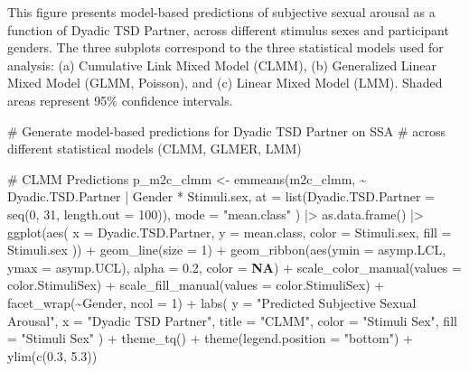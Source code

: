 \documentclass[
  bookmarksnumbered]{article}
\newenvironment{Shaded}{\begin{snugshade}}{\end{snugshade}}
\newcommand{\AttributeTok}[1]{\textcolor[rgb]{0.80,0.80,0.80}{#1}}
\newcommand{\CommentTok}[1]{\textcolor[rgb]{0.50,0.62,0.50}{#1}}
\newcommand{\ConstantTok}[1]{\textcolor[rgb]{0.86,0.64,0.64}{\textbf{#1}}}
\newcommand{\DecValTok}[1]{\textcolor[rgb]{0.86,0.86,0.80}{#1}}
\newcommand{\FloatTok}[1]{\textcolor[rgb]{0.75,0.75,0.82}{#1}}
\newcommand{\FunctionTok}[1]{\textcolor[rgb]{0.94,0.94,0.56}{#1}}
\newcommand{\NormalTok}[1]{\textcolor[rgb]{0.80,0.80,0.80}{#1}}
\newcommand{\OtherTok}[1]{\textcolor[rgb]{0.94,0.94,0.56}{#1}}
\newcommand{\SpecialCharTok}[1]{\textcolor[rgb]{0.86,0.64,0.64}{#1}}
\newcommand{\StringTok}[1]{\textcolor[rgb]{0.80,0.58,0.58}{#1}}
\begin{document}
This figure presents model-based predictions of subjective sexual arousal as a function of Dyadic TSD Partner, across different stimulus sexes and participant genders. The three subplots correspond to the three statistical models used for analysis: (a) Cumulative Link Mixed Model (CLMM), (b) Generalized Linear Mixed Model (GLMM, Poisson), and (c) Linear Mixed Model (LMM). Shaded areas represent 95\% confidence intervals.

\begin{Shaded}
\begin{Highlighting}[]
\CommentTok{\# Generate model{-}based predictions for Dyadic TSD Partner on SSA}
\CommentTok{\# across different statistical models (CLMM, GLMER, LMM)}

\CommentTok{\# CLMM Predictions}
\NormalTok{p\_m2c\_clmm }\OtherTok{\textless{}{-}} \FunctionTok{emmeans}\NormalTok{(m2c\_clmm, }\SpecialCharTok{\textasciitilde{}}\NormalTok{ Dyadic.TSD.Partner }\SpecialCharTok{|}\NormalTok{ Gender }\SpecialCharTok{*}\NormalTok{ Stimuli.sex,}
  \AttributeTok{at =} \FunctionTok{list}\NormalTok{(}\AttributeTok{Dyadic.TSD.Partner =} \FunctionTok{seq}\NormalTok{(}\DecValTok{0}\NormalTok{, }\DecValTok{31}\NormalTok{, }\AttributeTok{length.out =} \DecValTok{100}\NormalTok{)),}
  \AttributeTok{mode =} \StringTok{"mean.class"}
\NormalTok{) }\SpecialCharTok{|\textgreater{}}
  \FunctionTok{as.data.frame}\NormalTok{() }\SpecialCharTok{|\textgreater{}}
  \FunctionTok{ggplot}\NormalTok{(}\FunctionTok{aes}\NormalTok{(}
    \AttributeTok{x =}\NormalTok{ Dyadic.TSD.Partner, }\AttributeTok{y =}\NormalTok{ mean.class,}
    \AttributeTok{color =}\NormalTok{ Stimuli.sex, }\AttributeTok{fill =}\NormalTok{ Stimuli.sex}
\NormalTok{  )) }\SpecialCharTok{+}
  \FunctionTok{geom\_line}\NormalTok{(}\AttributeTok{size =} \DecValTok{1}\NormalTok{) }\SpecialCharTok{+}
  \FunctionTok{geom\_ribbon}\NormalTok{(}\FunctionTok{aes}\NormalTok{(}\AttributeTok{ymin =}\NormalTok{ asymp.LCL, }\AttributeTok{ymax =}\NormalTok{ asymp.UCL), }\AttributeTok{alpha =} \FloatTok{0.2}\NormalTok{, }\AttributeTok{color =} \ConstantTok{NA}\NormalTok{) }\SpecialCharTok{+}
  \FunctionTok{scale\_color\_manual}\NormalTok{(}\AttributeTok{values =}\NormalTok{ color.StimuliSex) }\SpecialCharTok{+}
  \FunctionTok{scale\_fill\_manual}\NormalTok{(}\AttributeTok{values =}\NormalTok{ color.StimuliSex) }\SpecialCharTok{+}
  \FunctionTok{facet\_wrap}\NormalTok{(}\SpecialCharTok{\textasciitilde{}}\NormalTok{Gender, }\AttributeTok{ncol =} \DecValTok{1}\NormalTok{) }\SpecialCharTok{+}
  \FunctionTok{labs}\NormalTok{(}
    \AttributeTok{y =} \StringTok{"Predicted Subjective Sexual Arousal"}\NormalTok{,}
    \AttributeTok{x =} \StringTok{"Dyadic TSD Partner"}\NormalTok{,}
    \AttributeTok{title =} \StringTok{"CLMM"}\NormalTok{,}
    \AttributeTok{color =} \StringTok{"Stimuli Sex"}\NormalTok{, }\AttributeTok{fill =} \StringTok{"Stimuli Sex"}
\NormalTok{  ) }\SpecialCharTok{+}
  \FunctionTok{theme\_tq}\NormalTok{() }\SpecialCharTok{+}
  \FunctionTok{theme}\NormalTok{(}\AttributeTok{legend.position =} \StringTok{"bottom"}\NormalTok{) }\SpecialCharTok{+}
  \FunctionTok{ylim}\NormalTok{(}\FunctionTok{c}\NormalTok{(}\FloatTok{0.3}\NormalTok{, }\FloatTok{5.3}\NormalTok{))}


\end{Highlighting}
\end{Shaded}
\end{document}

